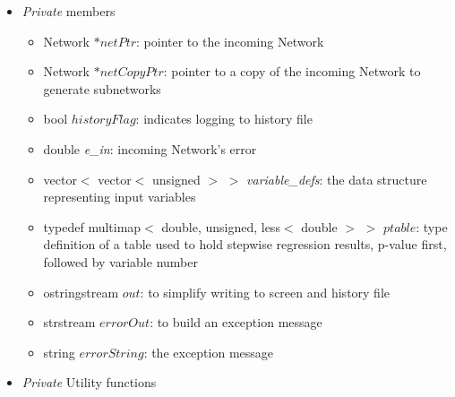 \documentclass{report}
\begin{document}
\begin{itemize}
\item {\em Private} members

\begin{itemize}
\item Network $*netPtr$: pointer to the incoming Network
\item Network $*netCopyPtr$: pointer to a copy of the incoming Network
      to generate subnetworks
\item bool $historyFlag$: indicates logging to history file
\item double {\em e\_in}: incoming Network's error
\item vector$<$ vector$<$ unsigned $>$ $>$ {\em variable\_defs}: the
      data structure representing input variables
\item typedef multimap$<$ double, unsigned, less$<$ double $>$ $>$
      $ptable$: type definition of a table used to hold stepwise
      regression
      results, p-value first, followed by variable number
\item ostringstream $out$: to simplify writing to screen and history
file
\item strstream $errorOut$: to build an exception message
\item string $errorString$: the exception message
\end{itemize}

\item {\em Private} Utility functions


\end{itemize}
\end{document}
